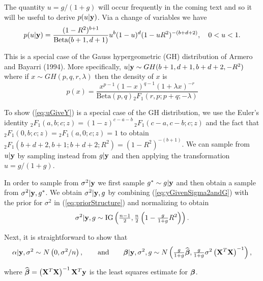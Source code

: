\documentclass{article}[12pt]
\def\N{N}
\begin{document}
The quantity $u=g/(1+g)$ will occur frequently in the coming text and so it will be useful to derive $p(u|{\bf y})$.
Via a change of variables we have
\begin{equation}\label{eq:uGiveY}
p(u|{\bf y}) = \frac{(1 -  R^2)^{b+1}}{\mbox{Beta}(b + 1,d+1)} 
u^{b}  (1 - u)^d (  1 -  uR^2 )^{-(b + d + 2)}, \quad 0<u<1.
\end{equation}

\noindent This is a special case of the
Gauss hypergeometric (GH) distribution
of Armero and Bayarri (1994).
More specifically,
$u|{\bf y} \sim GH(b+1,d+1,b+d+2,-R^2)$
where if $x \sim GH(p,q,r,\lambda)$
then the density of $x$ is
$$
p(x) = \frac{x^{p-1}(1 - x)^{q-1}(1 + \lambda x)^{-r}}{\mbox{Beta}(p,q){}_2F_1(r,p;p+q; -\lambda)}
$$

\noindent To show (\ref{eq:uGiveY}) is a special case
of the GH distribution, we use the
Euler's identity 
${}_{2}F_{1}(a,b;c;z)=(1-z)^{c-a-b}\,{}_{2}F_{1}(c-a,c-b;c;z)$
and the fact that
${}_2F_1(0,b;c;z) = {}_2F_1(a,0;c;z) = 1$
to obtain 
${}_2F_1(b+d+2,b+1;b+d+2; R^2) = (1 -  R^2)^{-(b+1)}$.
We can sample from $u|{\bf y}$ by sampling instead from
$g|{\bf y}$ and then applying the transformation $u=g/(1+g)$.




 
In order to sample from $\sigma^2|{\bf y}$ 
we first sample $g^* \sim g|{\bf y}$ and then obtain
a  sample from $\sigma^2|{\bf y},g^*$.
We obtain $\sigma^2|{\bf y},g$
by combining (\ref{eq:yGivenSigma2andG}) with the prior for $\sigma^2$
in (\ref{eq:priorStructure}) and normalizing to obtain
\begin{equation}\label{eq:sigma2GivenYandG}
\displaystyle \sigma^2|{\bf y},g 
\sim \mbox{IG}\left( \tfrac{n-1}{2},\tfrac{n}{2}\left( 1 - \tfrac{g}{1+g} R^2\right) \right).
\end{equation}


Next, it is straightforward to show that 
\begin{equation}\label{eq:coefficientsGivenYandG}
\alpha|\vy,\sigma^2 \sim N\left( 0, \sigma^2/n \right), 
\qquad  \mbox{and} \qquad 
\vbeta|\vy,\sigma^2,g \sim \N\left(         
\tfrac{g}{1+g}\widehat{\vbeta},    
\tfrac{g}{1+g} \sigma^2 \left( \mX^T\mX \right)^{-1} 
\right),                              
\end{equation}

\noindent where $\widehat{{\boldsymbol \beta}} = \left( {\bf X}^T{\bf X} \right)^{-1} {\bf X}^T{\bf y}$ is the least squares 
estimate for ${\boldsymbol \beta}$.
\end{document}
